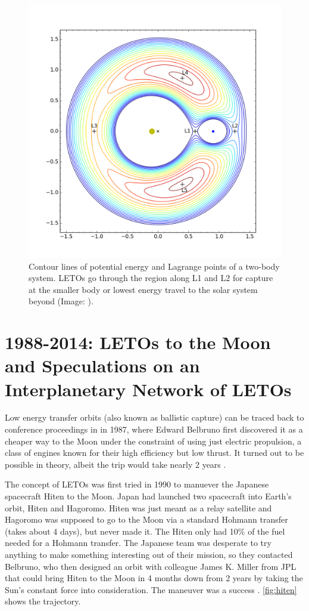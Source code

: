 \begin{figure}[ht]
    \centering
    \includegraphics[width=0.70\linewidth]{fig/lagrange-points-energy-contour-lines.png}
    \caption{Contour lines of potential energy and Lagrange points of a two-body system. LETOs go through the region along L1 and L2 for capture at the smaller body or lowest energy travel to the solar system beyond (Image: \cite{Drang}).}
    \label{fig:lagrange-points-energy-contour-lines}
\end{figure}
\section{1988-2014: LETOs to the Moon and Speculations on an Interplanetary Network of LETOs}
Low energy transfer orbits (also known as ballistic capture) can be traced back to conference proceedings in in 1987, where Edward Belbruno first discovered it as a cheaper way to the Moon under the constraint of using just electric propulsion, a class of engines known for their high efficiency but low thrust. It turned out to be possible in theory, albeit the trip would take nearly 2 years \cite{Belbruno1987, Benson}.

The concept of LETOs was first tried in 1990 to manuever the Japanese spacecraft Hiten to the Moon. Japan had launched two spacecraft into Earth's orbit, Hiten and Hagoromo. Hiten was just meant as a relay satellite and Hagoromo was supposed to go to the Moon via a standard Hohmann transfer (takes about 4 days), but never made it. The Hiten only had 10\% of the fuel needed for a Hohmann transfer. The Japanese team was desperate to try anything to make something interesting out of their mission, so they contacted Belbruno, who then designed an orbit with colleague James K. Miller from JPL that could bring Hiten to the Moon in 4 months down from 2 years by taking the Sun's constant force into consideration. The maneuver was a success \cite{Belbuno1990} \cite{Benson}. \cref{fig:hiten} shows the trajectory.

